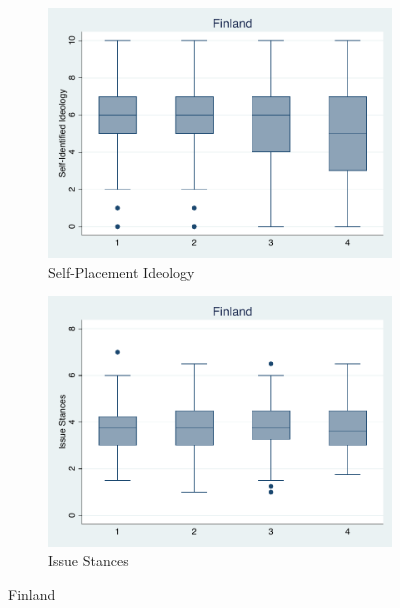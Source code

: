 \documentclass[12pt, titlepage]{article}
\begin{document}
\begin{figure}[H]
	\centering
	\begin{subfigure}[b]{0.475\textwidth}   
		\centering 
		\includegraphics[width=\textwidth]{IdeoBP/Finland}
		\caption{Self-Placement Ideology}
	\end{subfigure}
	\hfill
	\begin{subfigure}[b]{0.475\textwidth}
		\centering 
		\includegraphics[width=\textwidth]{BoxLib/Finland}
		\caption{Issue Stances}
	\end{subfigure}
	\caption{Finland}
	\label{Finland}
\end{figure}
\end{document}
